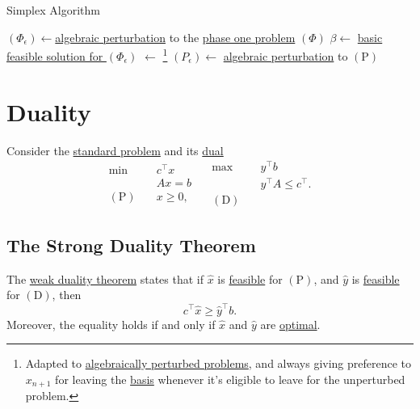 \begin{algorithm}[H]\label{algo:simplex-algorithm}
	\DontPrintSemicolon
	\caption{Simplex Algorithm}
	\BlankLine

	\((\Phi_{\epsilon})\gets\)\hyperref[def:perturbed-problem]{algebraic perturbation} to the \hyperref[def:phase-one-problem]{phase one problem} \((\Phi)\)\;
	\(\beta \gets \) \hyperref[prob:phase-one-problem]{basic feasible solution for \((\Phi_{\epsilon })\)}\;
	\result \(\gets\) \WFSimplex{\((\Phi _\epsilon )\), \(\beta\)}\footnote{Adapted to \hyperref[def:perturbed-problem]{algebraically perturbed problems}, and always giving preference to \(x_{n+1}\) for leaving the \hyperref[def:basis]{basis} whenever it's eligible to leave for the unperturbed problem.}\;
	\;
	\((P_{\epsilon} )\gets\) \hyperref[def:perturbed-problem]{algebraic perturbation} to \((\mathrm{P})\)\;
\end{algorithm}

\chapter{Duality}
Consider the \hyperref[def:standard-form]{standard problem} and its \hyperref[def:dual]{dual}
\[
	\begin{aligned}
		\min~             & c^{\top}x \\
		                  & Ax = b    \\
		(\mathrm{P})\quad & x\geq  0,
	\end{aligned}\quad \begin{aligned}
		\max ~            & y^{\top}b               \\
		                  & y^{\top}A\leq c^{\top}. \\
		(\mathrm{D})\quad &
	\end{aligned}
\]

\section{The Strong Duality Theorem}
\begin{prev}
	The \hyperref[thm:weak-duality]{weak duality theorem} states that if \(\hat{x}\) is \hyperref[def:feasible-solution]{feasible} for \((\mathrm{P})\), and \(\hat{y}\) is \hyperref[def:feasible-solution]{feasible} for \((\mathrm{D})\), then
	\[
		c^{\top} \hat{x} \geq  \hat{y}^{\top} b.
	\]
	Moreover, the equality holds if and only if \(\hat{x}\) and \(\hat{y}\) are \hyperref[def:optimal-solution]{optimal}.
\end{prev}

